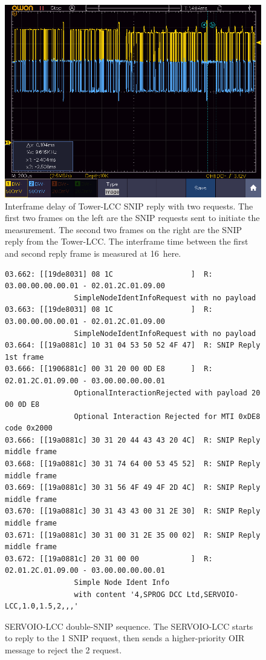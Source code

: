 \documentclass[11pt]{article}
\begin{document}
\begin{figure}[!htbp]
\centering
\includegraphics[width=1.0\linewidth]{2SNIP_TWR_Spacing}
\caption{Interframe delay of Tower-LCC SNIP reply with two requests.
The first two frames on the left are the SNIP requests sent to initiate the measurement.
The second two frames on the right are the SNIP reply from the Tower-LCC.
The interframe time between the first and second reply frame is measured at 16\us~here.
}
\label{fig:double_TWR_SNIP_interframe}
\end{figure}

\cbstart
\begin{figure}[!htbp]
\begin{verbatim}
03.662: [[19de8031] 08 1C                  ]  R: 03.00.00.00.00.01 - 02.01.2C.01.09.00 
                SimpleNodeIdentInfoRequest with no payload
03.663: [[19de8031] 08 1C                  ]  R: 03.00.00.00.00.01 - 02.01.2C.01.09.00
                SimpleNodeIdentInfoRequest with no payload
03.664: [[19a0881c] 10 31 04 53 50 52 4F 47]  R: SNIP Reply 1st frame
03.666: [[1906881c] 00 31 20 00 0D E8      ]  R: 02.01.2C.01.09.00 - 03.00.00.00.00.01 
                OptionalInteractionRejected with payload 20 00 0D E8 
                Optional Interaction Rejected for MTI 0xDE8 code 0x2000
03.666: [[19a0881c] 30 31 20 44 43 43 20 4C]  R: SNIP Reply middle frame
03.668: [[19a0881c] 30 31 74 64 00 53 45 52]  R: SNIP Reply middle frame
03.669: [[19a0881c] 30 31 56 4F 49 4F 2D 4C]  R: SNIP Reply middle frame
03.670: [[19a0881c] 30 31 43 43 00 31 2E 30]  R: SNIP Reply middle frame
03.671: [[19a0881c] 30 31 00 31 2E 35 00 02]  R: SNIP Reply middle frame
03.672: [[19a0881c] 20 31 00 00            ]  R: 02.01.2C.01.09.00 - 03.00.00.00.00.01 
                Simple Node Ident Info 
                with content '4,SPROG DCC Ltd,SERVOIO-LCC,1.0,1.5,2,,,'

\end{verbatim}
\caption{SERVOIO-LCC double-SNIP sequence. The SERVOIO-LCC starts to reply to the 1
        SNIP request, then sends a higher-priority OIR message to reject the
        2 request.}
\label{fig:SERVOIO_double_SNIP_reply_sequence}
\end{figure}
\cbend
\end{document}
